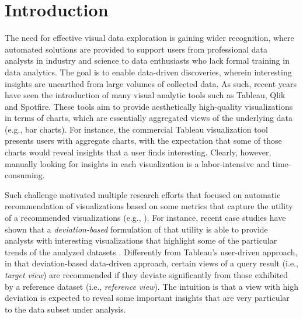 
\section{Introduction}
\label{introduction}


The need for effective visual data exploration is gaining wider recognition, where automated solutions are  provided to support users from professional data analysts in industry and science to data enthusiasts who lack formal training in data analytics.
%
The goal is to enable data-driven discoveries, wherein interesting insights are unearthed from large volumes of collected data.
%
As such, recent years have seen the introduction of many visual analytic tools such as Tableau, Qlik and Spotfire. 
%
These tools aim to provide aesthetically high-quality visualizations in terms of charts, which are essentially aggregated views of the underlying data (e.g., bar charts).
%
For instance, the commercial Tableau visualization tool presents users with aggregate charts, with the expectation that some of those charts would reveal insights that a user finds interesting. 
%
Clearly, however, manually looking for insights in each visualization is a labor-intensive and time-consuming. 

%
%
Such challenge motivated multiple research efforts that focused on automatic recommendation of visualizations based on some metrics that capture the utility of a recommended visualizations (e.g., \cite{Key2012,Viegas2007,DBLP:journals/pvldb/SellamK16,DBLP:conf/ssdbm/SellamK16, Vartak2014,Vartak2015,Ehsan2016,kandel2012profiler,DBLP:journals/tvcg/SeoS06}). 
%
For instance, recent case studies have shown that a {\em deviation-based} formulation of that utility is able to provide analysts with interesting visualizations that highlight some of the particular trends of the analyzed datasets \cite{Vartak2014, Vartak2015}.
%
Differently from Tableau's user-driven approach, in that deviation-based data-driven approach, certain views of a query result (i.e., {\em target view}) are recommended if they deviate significantly from those exhibited by a reference dataset (i.e., {\em reference view}).
%
The intuition is that a view with high deviation is expected to reveal some important insights that are very particular to the data subset under analysis. 




